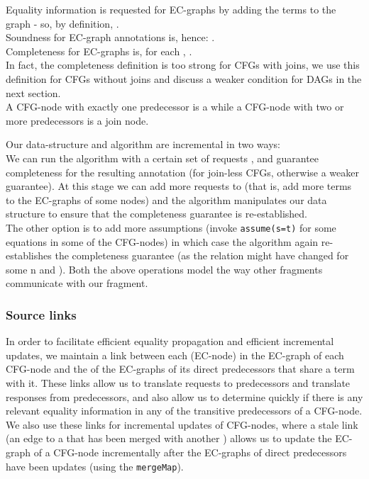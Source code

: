 Equality information is requested for EC-graphs by adding the terms to the graph - so, by definition, .\\
Soundness for EC-graph annotations is, hence: .\\
Completeness for EC-graphs is, for each , .\\
In fact, the completeness definition is too strong for CFGs with joins, we use this definition for CFGs without joins and discuss a weaker condition for DAGs in the next section. \\
A CFG-node with exactly one predecessor is a  while a CFG-node with two or more predecessors is a join node.

Our data-structure and algorithm are incremental in two ways:\\
We can run the algorithm with a certain set of requests , and guarantee completeness for the resulting annotation (for join-less CFGs, otherwise a weaker guarantee). 
At this stage we can add more requests to  (that is, add more terms to the EC-graphs of some nodes) and the algorithm manipulates our data structure to ensure that the completeness guarantee is re-established.\\
The other option is to add more assumptions (invoke \lstinline|assume(s=t)| for some equations  in some of the CFG-nodes) in which case the algorithm again re-establishes the completeness guarantee (as the relation  might have changed for some n and ). Both the above operations model the way other fragments communicate with our fragment.

\subsubsection*{Source links}\label{section:ugfole:sources}
In order to facilitate efficient equality propagation and efficient incremental updates, we maintain a link between each \GT{} (EC-node) in the EC-graph of each CFG-node and the \GTs{} of the EC-graphs of its direct predecessors that share a term with it. These links allow us to translate requests to predecessors and translate responses from predecessors, and also allow us to determine quickly if there is any relevant equality information in any of the transitive predecessors of a CFG-node.\\
We also use these links for incremental updates of CFG-nodes, where a stale link (an edge to a \GT{} that has been merged with another \GT{}) allows us to update the EC-graph of a CFG-node incrementally after the EC-graphs of direct predecessors have been updates (using the \lstinline|mergeMap|).

